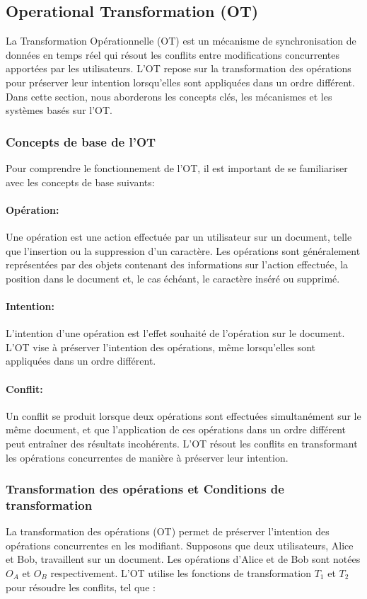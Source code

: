 \subsection{Operational Transformation (OT)}
La Transformation Opérationnelle (OT) est un mécanisme de synchronisation de données en temps réel qui résout les conflits entre modifications concurrentes apportées par les utilisateurs. L'OT repose sur la transformation des opérations pour préserver leur intention lorsqu'elles sont appliquées dans un ordre différent. Dans cette section, nous aborderons les concepts clés, les mécanismes et les systèmes basés sur l'OT.

\subsubsection{Concepts de base de l'OT}
Pour comprendre le fonctionnement de l'OT, il est important de se familiariser avec les concepts de base suivants:

\paragraph{Opération:} Une opération est une action effectuée par un utilisateur sur un document, telle que l'insertion ou la suppression d'un caractère. Les opérations sont généralement représentées par des objets contenant des informations sur l'action effectuée, la position dans le document et, le cas échéant, le caractère inséré ou supprimé.
\paragraph{Intention:} L'intention d'une opération est l'effet souhaité de l'opération sur le document. L'OT vise à préserver l'intention des opérations, même lorsqu'elles sont appliquées dans un ordre différent.
\paragraph{Conflit:} Un conflit se produit lorsque deux opérations sont effectuées simultanément sur le même document, et que l'application de ces opérations dans un ordre différent peut entraîner des résultats incohérents. L'OT résout les conflits en transformant les opérations concurrentes de manière à préserver leur intention.

\subsubsection{Transformation des opérations et Conditions de transformation}
La transformation des opérations (OT) permet de préserver l'intention des opérations concurrentes en les modifiant. Supposons que deux utilisateurs, Alice et Bob, travaillent sur un document. Les opérations d'Alice et de Bob sont notées $O_A$ et $O_B$ respectivement. L'OT utilise les fonctions de transformation $T_1$ et $T_2$ pour résoudre les conflits, tel que :

